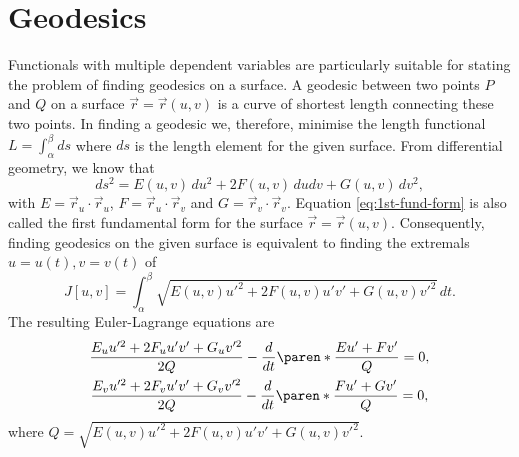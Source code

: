 \documentclass[11pt]{penrose}
\begin{document}
\section{Geodesics}
Functionals with multiple dependent variables are particularly suitable for stating the problem of finding geodesics on a surface. A geodesic between two points $P$ and $Q$ on a surface $\vec{r} = \vec{r}(u,v)$ is a curve of shortest length connecting these two points. In finding a geodesic we, therefore, minimise the length functional $L = \int_\alpha^\beta ds$ where $ds$ is the length element for the given surface. From differential geometry, we know that
\begin{equation}
    ds^2 = E(u,v) \,du^2 + 2 F(u,v) \,du dv + G(u,v) \,dv^2,
    \label{eq:1st-fund-form}
\end{equation}
with $E = \vec{r}_u \cdot \vec{r}_u$, $F = \vec{r}_u \cdot \vec{r}_v$ and $G = \vec{r}_v \cdot \vec{r}_v$. Equation \eqref{eq:1st-fund-form} is also called the first fundamental form for the surface $\vec{r} = \vec{r}(u,v)$. Consequently, finding geodesics on the given surface is equivalent to finding the extremals $u = u(t), v = v(t)$ of
\begin{equation}
    J[u, v] = \int_\alpha^\beta \sqrt{E(u,v) u'^2 + 2 F(u,v) u' v' + G(u,v) v'^2} \,dt.
\end{equation}
The resulting Euler-Lagrange equations are
\begin{gather}
    \frac{E_u u'^2 + 2F_u u' v' + G_u v'^2}{2Q} - \frac{d}{dt}\paren*{ \frac{E u' + F v'}{Q} } = 0,\\
    \frac{E_v u'^2 + 2F_v u' v' + G_v v'^2}{2Q} - \frac{d}{dt}\paren*{ \frac{F u' + G v'}{Q} } = 0,
\end{gather}
where $Q = \sqrt{E(u,v) u'^2 + 2 F(u,v) u' v' + G(u,v) v'^2}$.
\end{document}
